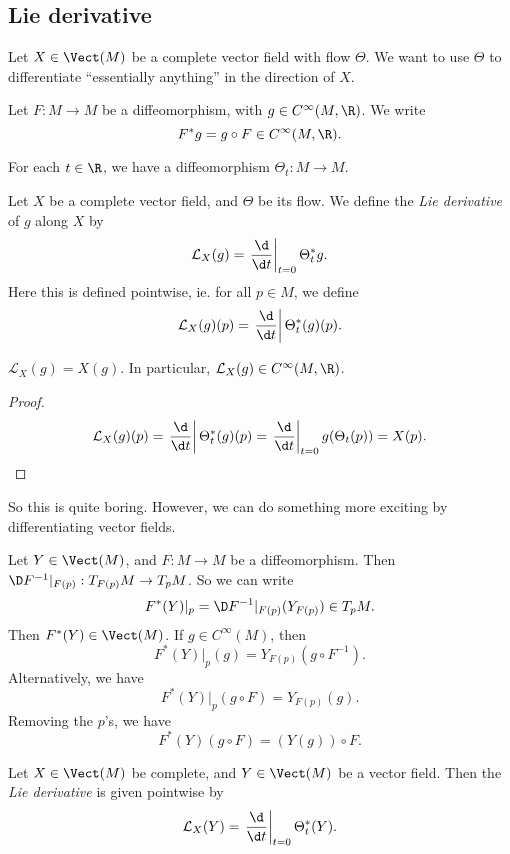 \documentclass[a4paper]{article}
\begin{document}
\subsection{Lie derivative}
Let $X \in \Vect(M)$ be a complete vector field with flow $\Theta$. We want to use $\Theta$ to differentiate ``essentially anything'' in the direction of $X$.

\begin{notation}
Let $F: M \to M$ be a diffeomorphism, with $g \in C^\infty(M, \R)$. We write
\[
  F^* g = g \circ F \in C^\infty(M, \R).
\]
\end{notation}

For each $t \in \R$, we have a diffeomorphism $\Theta_t: M \to M$.
\begin{defi}
  Let $X$ be a complete vector field, and $\Theta$ be its flow. We define the \emph{Lie derivative} of $g$ along $X$ by
  \[
    \mathcal{L}_X(g) = \left.\frac{\d}{\d t} \right|_{t = 0} \Theta_t^* g.
  \]
  Here this is defined pointwise, ie. for all $p \in M$, we define
  \[
    \mathcal{L}_X(g)(p) = \left.\frac{\d}{\d t}\right| \Theta_t^*(g)(p).
  \]
\end{defi}

\begin{lemma}
  $\mathcal{L}_X(g) = X(g)$. In particular, $\mathcal{L}_X(g) \in C^\infty(M, \R)$.
\end{lemma}

\begin{proof}
  \[
    \mathcal{L}_X(g)(p) = \left.\frac{\d}{\d t}\right| \Theta_t^*(g)(p) = \left.\frac{\d}{\d t}\right|_{t = 0} g(\Theta_t(p)) = X(p).
  \]
\end{proof}

So this is quite boring. However, we can do something more exciting by differentiating vector fields.

\begin{notation}
  Let $Y \in \Vect(M)$, and $F: M \to M$ be a diffeomorphism. Then $\D F^{-1}|_{F(p)}: T_{F(p)} M \to T_pM$. So we can write
  \[
    F^*(Y)|_p = \D F^{-1}|_{F(p)}(Y_{F(p)}) \in T_p M.
  \]
  Then $F^*(Y) \in \Vect(M)$. If $g \in C^\infty(M)$, then
  \[
    F^*(Y)|_p(g) = Y_{F(p)} (g \circ F^{-1}).
  \]
  Alternatively, we have
  \[
    F^*(Y)|_p(g \circ F) = Y_{F(p)}(g).
  \]
  Removing the $p$'s, we have
  \[
    F^*(Y)(g \circ F) = (Y(g)) \circ F.
  \]
\end{notation}

\begin{defi}
  Let $X \in \Vect(M)$ be complete, and $Y \in \Vect(M)$ be a vector field. Then the \emph{Lie derivative} is given pointwise by
  \[
    \mathcal{L}_X(Y) = \left.\frac{\d}{\d t}\right|_{t = 0} \Theta_t^*(Y).
  \]
\end{defi}
\end{document}
